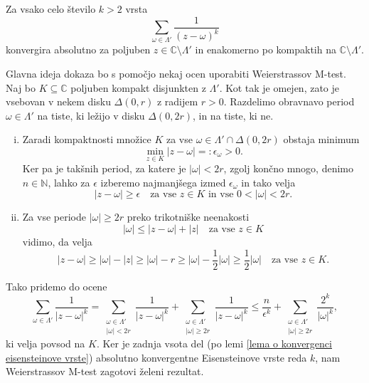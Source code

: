 \documentclass[mat1]{fmfdelo}
\numberwithin{equation}{section}
\newcommand{\N}{\mathbb N}
\newcommand{\C}{\mathbb C}
\newcommand{\om}{\omega}
\newcommand{\abs}[1]{\left\lvert #1 \right\rvert}
\theoremstyle{definition}
\begin{document}
\begin{lema}
    \label{lema o absolutni in enakomerni konvergenci}
    Za vsako celo število $k > 2$ vrsta 
    \[
        \sum_{\om \in \Lambda'} \frac{1}{(z - \om)^k}
    \]
    konvergira absolutno za poljuben $z\in \C\setminus\Lambda'$ in enakomerno po kompaktih na $\C \setminus \Lambda'$. 
\end{lema}

\begin{dokaz}
    Glavna ideja dokaza bo s pomočjo nekaj ocen uporabiti Weierstrassov M-test. Naj bo $K \subseteq \C$ poljuben kompakt disjunkten z $\Lambda'$. Kot tak je omejen, zato je vsebovan v nekem disku $\Delta(0,r)$ z radijem $r > 0$. Razdelimo obravnavo period $\omega \in \Lambda'$ na tiste, ki ležijo v disku $\Delta(0,2r)$, in na tiste, ki ne.
    \begin{enumerate}[(i)]
        \item 
    Zaradi kompaktnosti množice $K$ za vse $\omega \in \Lambda' \cap \Delta(0,2r)$ obstaja minimum
    \[
        \min_{z \in K} \abs{z - \omega} =: \epsilon_\omega > 0.
    \]
    Ker pa je takšnih period, za katere je $\abs{\omega} < 2r$, zgolj končno mnogo, denimo $n \in \N$, lahko za $\epsilon$ izberemo najmanjšega izmed $\epsilon_\om$ in tako velja 
    \[
        \abs{z - \omega} \geq \epsilon \quad \text{za vse $z \in K$ in vse $0 < \abs{\omega} < 2r$.}  
    \]
    
    \item
    Za vse periode $\abs{\omega} \geq 2r$ preko trikotniške neenakosti
    \[
        \abs{\om} \leq \abs{z - \om} + \abs{z} \quad \text{za vse $z \in K$}
    \]
    vidimo, da velja 
    \[
        \abs{z - \om} \geq 
        \abs{\om} - \abs{z} \geq 
        \abs{\om} - r \geq 
        \abs{\om} - \frac{1}{2}\abs{\om} \geq
        \frac{1}{2}\abs{\om} \quad \text{za vse $z\in K$.}
    \]
    \end{enumerate}
    Tako pridemo do ocene
    \[
        \sum_{\om \in \Lambda'} \frac{1}{\abs{z - \om}^k} = 
        \sum_{\substack{\om \in \Lambda' \\ \abs{\om} < 2r}} \frac{1}{\abs{z - \om}^k} + \sum_{\substack{\om \in \Lambda' \\ \abs{\om} \geq 2r}} \frac{1}{\abs{z - \om}^k} \leq
        \frac{n}{\epsilon^k} + \sum_{\substack{\om \in \Lambda' \\ \abs{\om} \geq 2r}} \frac{2^k}{\abs{\om}^k},
    \]
    ki velja povsod na $K$. Ker je zadnja vsota del (po lemi \ref{lema o konvergenci eisensteinove vrste}) absolutno konvergentne Eisensteinove vrste reda $k$, nam Weierstrassov M-test zagotovi želeni rezultat.
\end{dokaz}
\end{document}
